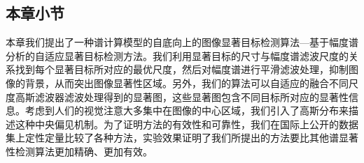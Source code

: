 \subsection{本章小节}
\label{4_2_5}

本章我们提出了一种谱计算模型的自底向上的图像显著目标检测算法---基于幅度谱分析的自适应显著目标检测方法。我们利用显著目标的尺寸与幅度谱滤波尺度的关系找到每个显著目标所对应的最优尺度，然后对幅度谱进行平滑滤波处理，抑制图像的背景，从而突出图像显著性区域。另外，我们的算法可以自适应的融合不同尺度高斯滤波器滤波处理得到的显著图，这些显著图包含不同目标所对应的显著性信息。考虑到人们的视觉注意大多集中在图像的中心区域，我们引入了高斯分布来描述这种中央偏见机制。为了证明方法的有效性和可靠性，我们在国际上公开的数据集上定性定量比较了各种方法，实验效果证明了我们所提出的方法要比其他谱显著性检测算法更加精确、更加有效。

















